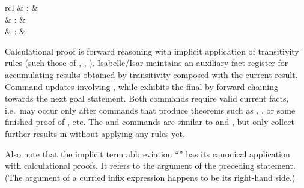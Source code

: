 \begin{isabellebody}
\begin{isamarkuptext}
\begin{matharray}{rcl}
    \hyperlink{attribute.trans}{\mbox{}} & : &  \\
    \hyperlink{attribute.sym}{\mbox{}} & : &  \\
    \hyperlink{attribute.symmetric}{\mbox{}} & : &  \\
  \end{matharray}

  Calculational proof is forward reasoning with implicit application
  of transitivity rules (such those of , ,
  ).  Isabelle/Isar maintains an auxiliary fact register
  \hyperlink{fact.calculation}{\mbox{}} for accumulating results obtained by
  transitivity composed with the current result.  Command \hyperlink{command.also}{\mbox{}} updates \hyperlink{fact.calculation}{\mbox{}} involving \hyperlink{fact.this}{\mbox{}}, while
  \hyperlink{command.finally}{\mbox{}} exhibits the final \hyperlink{fact.calculation}{\mbox{}} by
  forward chaining towards the next goal statement.  Both commands
  require valid current facts, i.e.\ may occur only after commands
  that produce theorems such as \hyperlink{command.assume}{\mbox{}}, \hyperlink{command.note}{\mbox{}}, or some finished proof of \hyperlink{command.have}{\mbox{}}, \hyperlink{command.show}{\mbox{}} etc.  The \hyperlink{command.moreover}{\mbox{}} and \hyperlink{command.ultimately}{\mbox{}}
  commands are similar to \hyperlink{command.also}{\mbox{}} and \hyperlink{command.finally}{\mbox{}},
  but only collect further results in \hyperlink{fact.calculation}{\mbox{}} without
  applying any rules yet.

  Also note that the implicit term abbreviation ``'' has
  its canonical application with calculational proofs.  It refers to
  the argument of the preceding statement. (The argument of a curried
  infix expression happens to be its right-hand side.)


\end{isamarkuptext}
\end{isabellebody}

